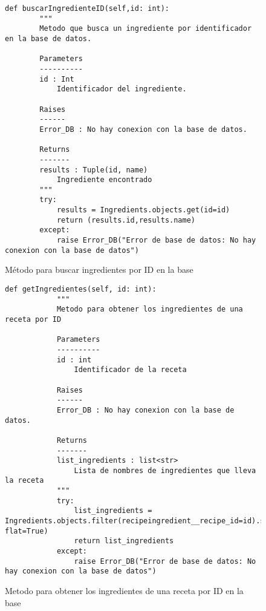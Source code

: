 \begin{figure}[H]
    \begin{lstlisting}[style=python]
        def buscarIngredienteID(self,id: int):
        """
        Metodo que busca un ingrediente por identificador en la base de datos.

        Parameters
        ----------
        id : Int
            Identificador del ingrediente.

        Raises
        ------
        Error_DB : No hay conexion con la base de datos.

        Returns
        -------
        results : Tuple(id, name)
            Ingrediente encontrado
        """
        try:
            results = Ingredients.objects.get(id=id)
            return (results.id,results.name)
        except:
            raise Error_DB("Error de base de datos: No hay conexion con la base de datos")
    \end{lstlisting}
    \caption{Método para buscar ingredientes por ID en la \gls{base}}
    \label{sni:buscarIngredienteID}
\end{figure}
\begin{figure}[H]
    \begin{lstlisting}[style=python]
        def getIngredientes(self, id: int):
            """
            Metodo para obtener los ingredientes de una receta por ID

            Parameters
            ----------
            id : int
                Identificador de la receta

            Raises
            ------
            Error_DB : No hay conexion con la base de datos.

            Returns
            -------
            list_ingredients : list<str>
                Lista de nombres de ingredientes que lleva la receta
            """
            try:
                list_ingredients = Ingredients.objects.filter(recipeingredient__recipe_id=id).select_related('recipeingredient').values_list('name', flat=True)
                return list_ingredients
            except:
                raise Error_DB("Error de base de datos: No hay conexion con la base de datos")
    \end{lstlisting}
    \caption{Metodo para obtener los ingredientes de una receta por ID en la \gls{base}}
    \label{sni:buscarRecetaIngredientesID}
\end{figure}
